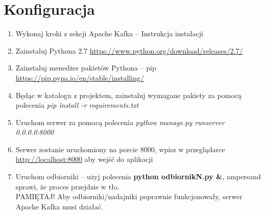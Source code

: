 \documentclass[a4paper,12pt]{article}
\begin{document}
\newpage
\section{Konfiguracja}
\begin{enumerate}
\item Wykonaj kroki z sekcji Apache Kafka -- Instrukcja instalacji
\item Zainstaluj Pythona 2.7 \url{https://www.python.org/download/releases/2.7/}
\item Zainstaluj menedżer pakietów Pythona -- pip \url{https://pip.pypa.io/en/stable/installing/}
\item Będąc w katalogu z projektem, zainstaluj wymagane pakiety za pomocą polecenia \textit{pip install -r requirements.txt}
\item Uruchom serwer za pomocą polecenia \textit{python manage.py runserver 0.0.0.0:8000}
\item Serwer zostanie uruchomiony na porcie 8000, wpisz w przeglądarce \url{http://localhost:8000} aby wejść do aplikacji
\item Uruchom odbiorniki -- użyj polecenia \textbf{python odbiornikN.py \&}, ampersand sprawi, że proces przejdzie w tło.\\ PAMIĘTAJ! Aby odbiorniki/nadajniki poprawnie funkcjonowały, serwer Apache Kafka musi działać.
\end{enumerate}
\newpage
\end{document}
